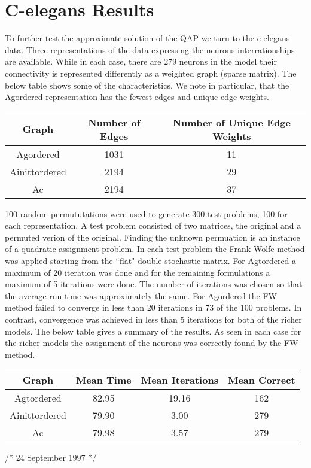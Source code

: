 \section{C-elegans Results}
To further test the approximate solution of the QAP we turn to the c-elegans data.  Three representations of the data expressing the neurons interrationships are available.  While in each case,
there are 279 neurons in the model their connectivity is represented differently as a 
weighted graph (sparse matrix).  The below table shows some of the characteristics.  
 We note in particular, that
the Agordered representation has the fewest edges and unique edge weights.

\begin{table}[h]
\begin{tabular}{|c|c|c|}

\hline
Graph   &  Number of Edges & Number of Unique Edge Weights\\
\hline
Agordered &    1031 &      11  \\
Ainittordered &    2194 &      29  \\
        Ac &    2194 &      37  \\
\hline 
\end{tabular} 
\end{table}

100 random permututations were used to generate
300 test problems, 100 for each representation.  A test problem consisted of two matrices,
the original and a permuted verion of the original.   Finding the unknown permuation is
an instance of a quadratic assignment problem.  In each test problem the Frank-Wolfe method
was applied starting from the ``flat" double-stochastic matrix.  For Agtordered a maximum of 20 
iteration was done and for the remaining formulations a maximum of 5 iterations were done.
The number of iterations was chosen so that the average run time was approximately the same.  For
Agordered the FW method failed to converge in less than 20 iterations in 73 of the 100 problems.  In contrast,  convergence was achieved in less than 5 iterations for both of the richer models.
The below table gives a summary of the results.  As seen in each case for the richer models
the assignment of the neurons was correctly found by the FW method.

\begin{table}[h]
\begin{tabular}{|c|c|c|c|}
\hline
Graph & Mean Time & Mean Iterations & Mean Correct \\
\hline
Agtordered &   82.95 &   19.16 &     162 \\
Ainittordered &   79.90 &    3.00 &     279 \\
        Ac &   79.98 &    3.57 &     279 \\
\hline 
\end{tabular} 
\end{table}





/* 24 September 1997 */
\Refs %
\widestnumber{}
\widestnumber{}
